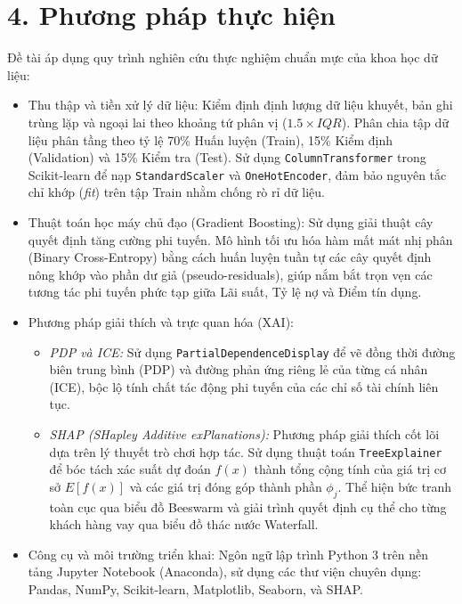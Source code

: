 \documentclass[12pt,a4paper,oneside]{report}
\begin{document}
\section*{4. Phương pháp thực hiện}
Đề tài áp dụng quy trình nghiên cứu thực nghiệm chuẩn mực của khoa học dữ liệu:
\begin{itemize}
    \item {Thu thập và tiền xử lý dữ liệu:} Kiểm định định lượng dữ liệu khuyết, bản ghi trùng lặp và ngoại lai theo khoảng tứ phân vị ($1.5 \times IQR$). Phân chia tập dữ liệu phân tầng theo tỷ lệ 70\% Huấn luyện (Train), 15\% Kiểm định (Validation) và 15\% Kiểm tra (Test). Sử dụng \texttt{ColumnTransformer} trong Scikit-learn để nạp \texttt{StandardScaler} và \texttt{OneHotEncoder}, đảm bảo nguyên tắc chỉ khớp (\textit{fit}) trên tập Train nhằm chống rò rỉ dữ liệu.
    \item {Thuật toán học máy chủ đạo (Gradient Boosting):} Sử dụng giải thuật cây quyết định tăng cường phi tuyến. Mô hình tối ưu hóa hàm mất mát nhị phân (Binary Cross-Entropy) bằng cách huấn luyện tuần tự các cây quyết định nông khớp vào phần dư giả (pseudo-residuals), giúp nắm bắt trọn vẹn các tương tác phi tuyến phức tạp giữa Lãi suất, Tỷ lệ nợ và Điểm tín dụng.
    \item {Phương pháp giải thích và trực quan hóa (XAI):}
    \begin{itemize}
        \item \textit{PDP và ICE:} Sử dụng \texttt{PartialDependenceDisplay} để vẽ đồng thời đường biên trung bình (PDP) và đường phản ứng riêng lẻ của từng cá nhân (ICE), bộc lộ tính chất tác động phi tuyến của các chỉ số tài chính liên tục.
        \item \textit{SHAP (SHapley Additive exPlanations):} Phương pháp giải thích cốt lõi dựa trên lý thuyết trò chơi hợp tác. Sử dụng thuật toán \texttt{TreeExplainer} để bóc tách xác suất dự đoán $f(x)$ thành tổng cộng tính của giá trị cơ sở $E[f(x)]$ và các giá trị đóng góp thành phần $\phi_j$. Thể hiện bức tranh toàn cục qua biểu đồ Beeswarm và giải trình quyết định cụ thể cho từng khách hàng vay qua biểu đồ thác nước Waterfall.
    \end{itemize}
    \item {Công cụ và môi trường triển khai:} Ngôn ngữ lập trình Python 3 trên nền tảng Jupyter Notebook (Anaconda), sử dụng các thư viện chuyên dụng: Pandas, NumPy, Scikit-learn, Matplotlib, Seaborn, và SHAP.
\end{itemize}
\end{document}
